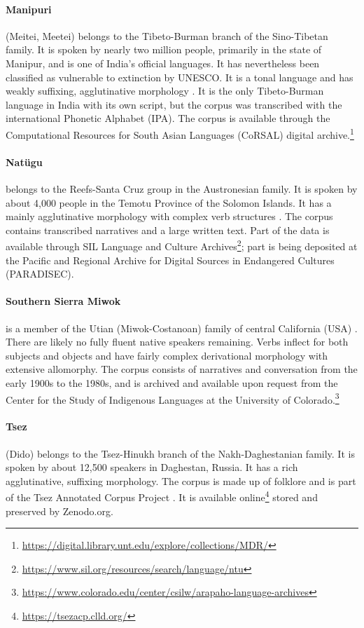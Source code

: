 \paragraph{Manipuri} 
(Meitei, Meetei) belongs to the Tibeto-Burman branch of the Sino-Tibetan family. It is spoken by nearly two million people, primarily in the state of Manipur, and is one of India's official languages. It has nevertheless been classified as vulnerable to extinction by UNESCO. It is a tonal language and has weakly suffixing, agglutinative morphology \citep{Chelliah-1997}. It is the only Tibeto-Burman language in India with its own script, but the corpus was transcribed with the international Phonetic Alphabet (IPA). The corpus is available through the Computational Resources for South Asian Languages (CoRSAL) digital archive.\footnote{\url{https://digital.library.unt.edu/explore/collections/MDR/}}

\paragraph{Natügu}
belongs to the Reefs-Santa Cruz group in the Austronesian family. It is spoken by about 4,000 people in the Temotu Province of the Solomon Islands. It has a mainly agglutinative morphology with complex verb structures \citep{naess_ntu_2008}. The corpus contains transcribed narratives and a large written text. Part of the data is available through SIL Language and Culture Archives\footnote{\url{https://www.sil.org/resources/search/language/ntu}}; part is being deposited at the Pacific and Regional Archive for Digital Sources in Endangered Cultures (PARADISEC).

\paragraph{Southern Sierra Miwok} 
is a member of the Utian (Miwok-Costanoan) family of central California (USA) \citep{broadbent_southern_1964}. There are likely no fully fluent native speakers remaining. Verbs inflect for both subjects and objects and have fairly complex derivational morphology with extensive allomorphy. The corpus consists of narratives and conversation from the early 1900s to the 1980s, and is archived and available upon request from the Center for the Study of Indigenous Languages at the University of Colorado.\footnote{\url{https://www.colorado.edu/center/csilw/arapaho-language-archives}}

\paragraph{Tsez}
(Dido) belongs to the Tsez-Hinukh branch of the Nakh-Daghestanian family. It is spoken by about 12,500 speakers in Daghestan, Russia. It has a rich agglutinative, suffixing morphology. The corpus is made up of folklore and is part of the Tsez Annotated Corpus Project \citep{abdulaev-tsezcorpus-2010}. It is available online\footnote{\url{https://tsezacp.clld.org/}} stored and preserved by Zenodo.org.

